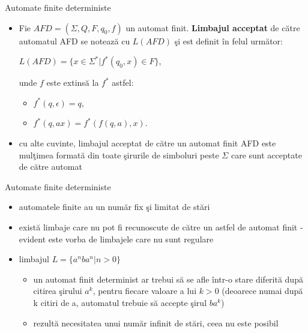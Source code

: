 \documentclass[pdf]{beamer}
\begin{document}
\begin{frame}{Automate finite deterministe}
\begin{itemize}
\item
Fie $AFD=(\Sigma, Q, F, q_{0}, f)$ un automat finit. \textbf{Limbajul acceptat} de către automatul AFD se notează cu $L(AFD)$ şi est definit în felul următor:

$L(AFD) = \{ x \in \Sigma^{*} | f^{*}(q_{0}, x) \in F \}$,

unde $f$ este extinsă la $f^{*}$ astfel:
\begin{itemize}
\item
$f^{*}(q, \epsilon) = q$,
\item
$f^{*}(q, ax) = f^{*}(f(q, a), x)$.
\end{itemize}
\item
cu alte cuvinte, limbajul acceptat de către un automat finit AFD este mulţimea formată din toate şirurile de simboluri peste $\Sigma$ care sunt acceptate de către automat
\end{itemize}
\end{frame}



\begin{frame}{Automate finite deterministe}
\begin{itemize}
\item
automatele finite au un număr fix şi limitat de stări
\item
există limbaje care nu pot fi recunoscute de către un astfel de automat finit - evident este vorba de limbajele care nu sunt regulare
\item
limbajul $L=\{a^n b a^n | n > 0 \}$
\begin{itemize}
\item
un automat finit determinist ar trebui să se afle într-o stare diferită după citirea şirului $a^k$, pentru fiecare valoare a lui $k>0$ (deoarece numai după k citiri de a, automatul trebuie să accepte şirul $b a^k$)
\item
rezultă necesitatea unui număr infinit de stări, ceea nu este posibil
\end{itemize}
\end{itemize}
\end{frame}
\end{document}
